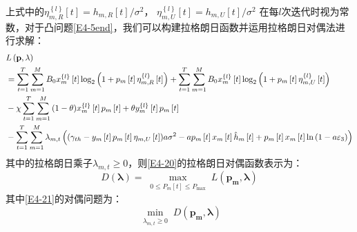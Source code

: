 上式中的$\eta_{m,R}^{\left\{ l \right\}}\left[t\right]=h_{m,R}\left[t\right]/{\sigma^2}$，
$\eta_{m,U}^{\left\{ l \right\}}\left[t\right]=h_{m,U}\left[t\right]/{\sigma^2}$
在每$l$次迭代时视为常数，对于凸问题\eqref{E4-5end}，我们可以构建拉格朗日函数并运用拉格朗日对偶法进行求解：
\begin{align}\label{E4-20}
&L\left(\mathbf{p},\lambda\right)\\
&=\sum_{t=1}^T \sum_{m=1}^M {B}_{0}x_{m}^{\left\{ l \right\}}\left[ t \right] %
\log_2{\left(1+p_m\left[t\right]\eta_{m,R}^{\left\{ l \right\}}\left[t\right]\right)}+                                                      \notag
\sum_{t=1}^T \sum_{m=1}^M {B}_{0}x_{m}^{\left\{ l \right\}}\left[ t \right]
\log_2{\left(1+p_m\left[t\right]\eta_{m,U}^{\left\{ l \right\}}\left[t\right]\right)}                     \\                                \notag
&-\chi \sum_{t=1}^T \sum_{m=1}^M{(1-\theta)x_{m}^{\left\{ l \right\}}\left[ t \right]p_m\left[t\right]
+\theta y_{m}^{\left\{ l \right\}}\left[ t \right]p_m\left[t\right]} \\
&-\sum\limits_{t=1}^{T}{\sum\limits_{m=1}^{M}{{{\lambda }_{m,t}}}}\left( ({{\gamma }_{th}}-{{y}_{m}}\left[ t \right]{{p}_{m}}\left[ t \right]{{\eta }_{m,U}}\left[ t \right])a{{\sigma }^{2}}-a{{p}_{m}}\left[ t \right]{{x}_{m}}\left[ t \right]{{{\hat{h}}}_{m}}\left[ t \right]+{{p}_{m}}\left[ t \right]{{x}_{m}}\left[ t \right]\ln \left( 1-a{{\varepsilon }_{3}} \right) \right)                                                                 \notag
\end{align}
其中的拉格朗日乘子$\lambda_{m,t}\geq 0$，则\eqref{E4-20}的拉格朗日对偶函数表示为：
\begin{equation} \label{E4-21}
D(\mathbf{\lambda})=\max _{\substack{0 \leq P_m[t] \leq P_{\max }}} L\left(\mathbf{p_m},\mathbf{\lambda}\right)
\end{equation}
其中\eqref{E4-21}的对偶问题为：
\begin{equation} \label{E4-22}
\min_{\substack{\lambda_{m,t}\geq 0}} D\left(\mathbf{p_m},\mathbf{\lambda}\right)
\end{equation}
